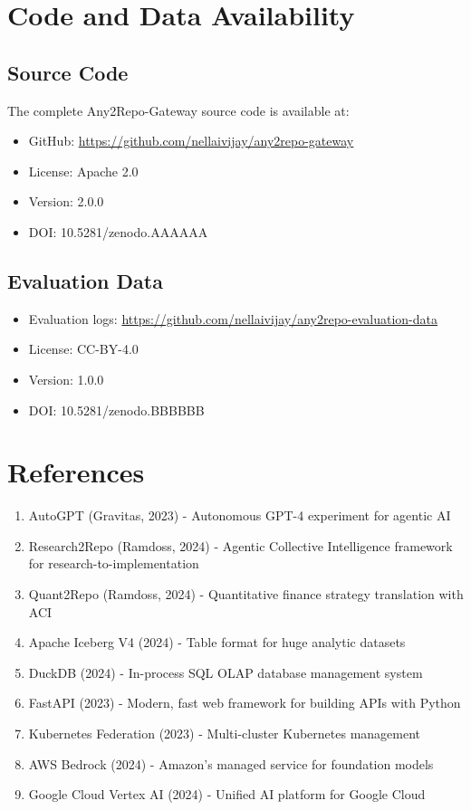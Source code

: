 \documentclass[10pt]{article}
\begin{document}
\section*{Code and Data Availability}

\subsection{Source Code}
The complete Any2Repo-Gateway source code is available at:
\begin{itemize}
    \item GitHub: \url{https://github.com/nellaivijay/any2repo-gateway}
    \item License: Apache 2.0
    \item Version: 2.0.0
    \item DOI: 10.5281/zenodo.AAAAAA
\end{itemize}

\subsection{Evaluation Data}
\begin{itemize}
    \item Evaluation logs: \url{https://github.com/nellaivijay/any2repo-evaluation-data}
    \item License: CC-BY-4.0
    \item Version: 1.0.0
    \item DOI: 10.5281/zenodo.BBBBBB
\end{itemize}

\section{References}

\begin{enumerate}
    \item AutoGPT (Gravitas, 2023) - Autonomous GPT-4 experiment for agentic AI
    \item Research2Repo (Ramdoss, 2024) - Agentic Collective Intelligence framework for research-to-implementation
    \item Quant2Repo (Ramdoss, 2024) - Quantitative finance strategy translation with ACI
    \item Apache Iceberg V4 (2024) - Table format for huge analytic datasets
    \item DuckDB (2024) - In-process SQL OLAP database management system
    \item FastAPI (2023) - Modern, fast web framework for building APIs with Python
    \item Kubernetes Federation (2023) - Multi-cluster Kubernetes management
    \item AWS Bedrock (2024) - Amazon's managed service for foundation models
    \item Google Cloud Vertex AI (2024) - Unified AI platform for Google Cloud
\end{enumerate}
\end{document}
